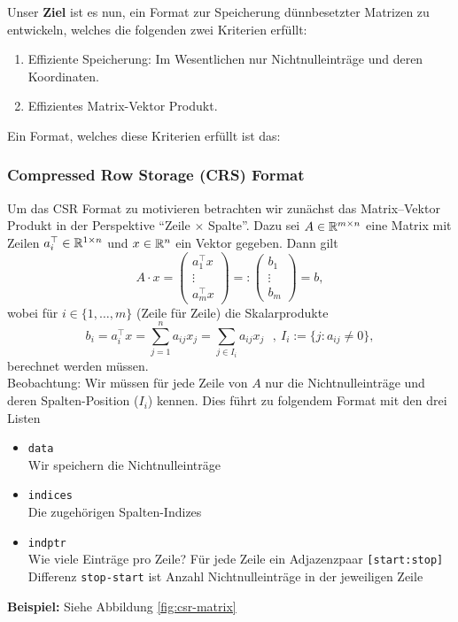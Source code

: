 Unser \textbf{Ziel} ist es nun, ein Format zur Speicherung dünnbesetzter Matrizen zu entwickeln, welches die folgenden zwei Kriterien erfüllt:
\begin{enumerate}
	\item Effiziente Speicherung: Im Wesentlichen nur Nichtnulleinträge und deren Koordinaten.
	\item Effizientes Matrix-Vektor Produkt.
\end{enumerate}
Ein Format, welches diese Kriterien erfüllt ist das:
\subsubsection{Compressed Row Storage (CRS) Format}
Um das CSR Format zu motivieren betrachten wir zunächst das Matrix--Vektor Produkt in der Perspektive ``Zeile $\times$ Spalte''. Dazu sei $A \in {\mathbb{R}}^{m\times n}$ eine Matrix mit Zeilen $a_i^\top \in {\mathbb{R}}^{1 \times n}$ und $x \in {\mathbb{R}}^{n}$ ein Vektor gegeben. Dann gilt
$$A\cdot x =  \begin{pmatrix}
a_1^\top x \\ \vdots \\a_m^\top x
\end{pmatrix} =:\begin{pmatrix}
b_1  \\ \vdots \\b_m
\end{pmatrix}= b,$$
wobei für $i \in \{1,\ldots, m\}$ (Zeile für Zeile) die Skalarprodukte 
$$b_i = a_i^\top x = \sum_{j=1}^n a_{ij} x_j = \sum_{j \in I_i} a_{ij}x_j ~~~,~I_i := \{j: a_{ij} \neq 0\},$$
berechnet werden müssen.\\
Beobachtung: Wir müssen für jede Zeile von $A$ nur die Nichtnulleinträge und deren Spalten-Position ($I_i$) kennen. Dies führt zu folgendem Format mit den drei Listen
\begin{itemize}
	\item \texttt{data}\\
	Wir speichern die Nichtnulleinträge 
	\item \texttt{indices}\\
	Die zugehörigen Spalten-Indizes
	\item \texttt{indptr}\\
	Wie viele Einträge pro Zeile? Für jede Zeile ein Adjazenzpaar \texttt{[start:stop]} \\
	 Differenz \texttt{stop-start} ist Anzahl Nichtnulleinträge in der jeweiligen Zeile
\end{itemize}
\textbf{Beispiel:} Siehe Abbildung \ref{fig:csr-matrix}
